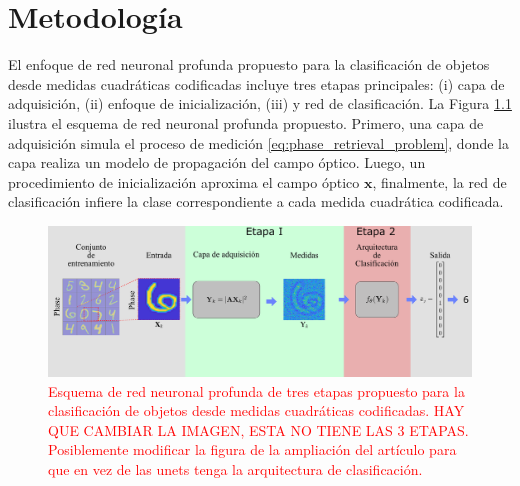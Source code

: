 
\chapter{Metodología}

El enfoque de red neuronal profunda propuesto para la clasificación de objetos desde medidas cuadráticas codificadas incluye tres etapas principales: (i) capa de adquisición, (ii) enfoque de inicialización, (iii) y red de clasificación. La Figura \ref{fig:esquema_entrenamiento} ilustra el esquema de red neuronal profunda propuesto. Primero, una capa de adquisición simula el proceso de medición \eqref{eq:phase_retrieval_problem}, donde la capa realiza un modelo de propagación del campo óptico. Luego, un procedimiento de inicialización aproxima el campo óptico $\mathbf{x}$, finalmente, la red de clasificación infiere la clase correspondiente a cada medida cuadrática codificada.


\begin{figure}[!h]
    \centering
    \includegraphics[width=\linewidth]{images/esquema_entrenamiento.pdf}
    \caption{\textcolor{red}{Esquema de red neuronal profunda de tres etapas propuesto para la clasificación de objetos desde medidas cuadráticas codificadas. HAY QUE CAMBIAR LA IMAGEN, ESTA NO TIENE LAS 3 ETAPAS. Posiblemente modificar la figura de la ampliación del artículo para que en vez de las unets tenga la arquitectura de clasificación.}}
    \label{fig:esquema_entrenamiento}
\end{figure}


